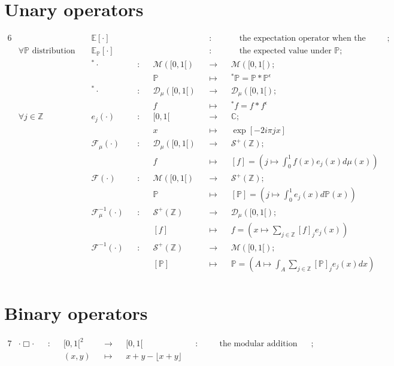 \section*{Unary operators}
\begin{alignat*}{6}
& &&\mathds{E}[\cdot] && && &&:&& \quad \text{the expectation operator when the distribution is obvious};\\
& \forall \mathds{P} \text{ distribution } && \mathds{E}_{\mathds{P}}[\cdot] && && &&:&& \quad \text{the expected value under } \mathds{P};\\
& && ^{*}\cdot &&:&& \mathcal{M}([0, 1[) && \rightarrow && \mathcal{M}([0, 1[);\\
& && && && \mathds{P} && \mapsto && ^{*}\mathds{P} = \mathds{P}*\mathds{P}^{\epsilon}\\
& && ^{*}\cdot &&:&& \mathcal{D}_{\mu}([0, 1[) && \rightarrow && \mathcal{D}_{\mu}([0, 1[);\\
& && && && f && \mapsto && ^{*}f = f*f^{\epsilon}\\
& \forall j \in \mathds{Z} && e_{j}(\cdot) &&:&& [0,1[ && \rightarrow && \mathds{C};\\
& && && && x && \mapsto && \exp[-2 i \pi j x]\\
& && \mathcal{F}_{\mu}(\cdot) &&:&& \mathcal{D}_{\mu}([0, 1[) && \rightarrow && \mathcal{S}^{+}(\mathds{Z});\\
& && && && f && \mapsto && [f] = \left(j \mapsto \int_{0}^{1} f(x) e_{j}(x) d\mu(x)\right)\\
& && \mathcal{F}(\cdot) &&:&& \mathcal{M}([0, 1[) && \rightarrow && \mathcal{S}^{+}(\mathds{Z});\\
& && && && \mathds{P} && \mapsto && [\mathds{P}] = \left(j \mapsto \int_{0}^{1} e_{j}(x) d\mathds{P}(x)\right)\\
& && \mathcal{F}_{\mu}^{-1}(\cdot) &&:&& \mathcal{S}^{+}(\mathds{Z}) && \rightarrow && \mathcal{D}_{\mu}([0, 1[);\\
& && && && [f] && \mapsto && f = \left(x \mapsto \sum\limits_{j \in \mathds{Z}} [f]_{j} e_{j}(x) \right)\\
& && \mathcal{F}^{-1}(\cdot) &&:&& \mathcal{S}^{+}(\mathds{Z}) && \rightarrow && \mathcal{M}([0, 1[);\\
& && && && [\mathds{P}] && \mapsto && \mathds{P} = \left(A \mapsto \int_{A} \sum\limits_{j \in \mathds{Z}} [\mathds{P}]_{j} e_{j}(x) dx\right)\\
\end{alignat*}

\section*{Binary operators}
\begin{alignat*}{7}
& \cdot \Box \cdot &&:&& [0,1[^{2} &&\rightarrow&& [0,1[ &&: && \quad \text{the modular addition binary operator on the unit segment};\\
& && && (x,y) &&\mapsto&& x+y-\lfloor x+y \rfloor && &&\\
\end{alignat*}

